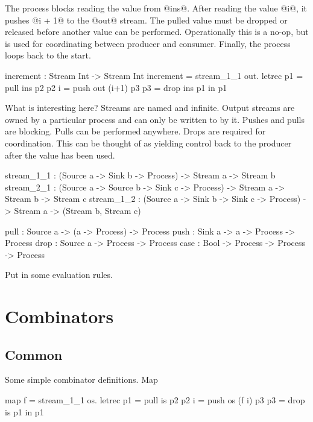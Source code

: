 The process blocks reading the value from @ins@.
After reading the value @i@, it pushes @i + 1@ to the @out@ stream.
The pulled value must be dropped or released before another value can be performed.
Operationally this is a no-op, but is used for coordinating between producer and consumer.
Finally, the process loops back to the start.

\begin{code}
increment : Stream Int -> Stream Int
increment = stream_1_1 \ins out.
  letrec
    p1   = pull ins       p2
    p2 i = push out (i+1) p3
    p3   = drop ins       p1
  in p1
\end{code}

What is interesting here?
Streams are named and infinite.
Output streams are owned by a particular process and can only be written to by it.
Pushes and pulls are blocking.
Pulls can be performed anywhere.
Drops are required for coordination.
This can be thought of as yielding control back to the producer after the value has been used.

\begin{code}
stream_1_1 : (Source a -> Sink b
              -> Process)
          -> Stream a -> Stream b
stream_2_1 : (Source a -> Source b -> Sink c
              -> Process)
          -> Stream a -> Stream b -> Stream c
stream_1_2 : (Source a -> Sink b -> Sink c
              -> Process)
          -> Stream a -> (Stream b, Stream c)

pull : Source a -> (a -> Process) -> Process
push : Sink   a ->  a -> Process  -> Process
drop : Source a ->       Process  -> Process
case : Bool -> Process -> Process -> Process
\end{code}

Put in some evaluation rules.

\section{Combinators}
\label{s:Combinators}

\subsection{Common}
\label{s:Combinators:Common}

Some simple combinator definitions.
Map 

\begin{code}
map f = stream_1_1 \is os.
  letrec
    p1   = pull is p2
    p2 i = push os (f i) p3
    p3   = drop is p1
  in p1
\end{code}

